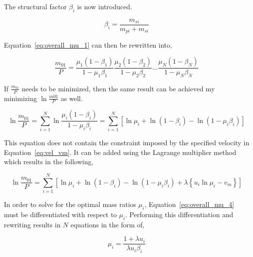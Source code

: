 The structural factor $\beta_i$ is now introduced.

\begin{equation}
    \beta_i = \frac{m_{si}}{m_{pi}+m_{si}}
\end{equation}

Equation~\eqref{eq:overall_mu_1} can then be rewritten into,

\begin{equation}
    \label{eq:overall_mu_2}
    \frac{m_{01}}{P} = \frac{\mu_1\left(1-\beta_1\right)}{1-\mu_1\beta_1}
                       \frac{\mu_2\left(1-\beta_2\right)}{1-\mu_2\beta_2} \dots
                       \frac{\mu_N\left(1-\beta_N\right)}{1-\mu_N\beta_N}
\end{equation}

If $\frac{m_{01}}{P}$ needs to be minimized, then the same result can be achieved my minimizing $\ln{\frac{m01}{P}}$ as well.

\begin{equation}
    \label{eq:overall_mu_3}
    \ln{\frac{m_{01}}{P}} = \sum_{i=1}^N \ln{\frac{\mu_i\left(1-\beta_i\right)}{1-\mu_i\beta_i}} 
                          = \sum_{i=1}^N \left[\ln{\mu_i} 
                                         + \ln{\left(1-\beta_i\right)} 
                                         - \ln{\left(1-\mu_i\beta_i\right)} \right]
\end{equation}

This equation does not contain the constraint imposed by the specified velocity in Equation~\ref{eq:vel_vm}. It can be added using the Lagrange multiplier method which results in the following,

\begin{equation}
    \label{eq:overall_mu_4}
    \ln{\frac{m_{01}}{P}} = \sum_{i=1}^N \left[\ln{\mu_i} 
                                      + \ln{\left(1-\beta_i\right)} 
                                      - \ln{\left(1-\mu_i\beta_i\right)} 
                                      + \lambda \left\{u_i\ln{\mu_i - v_m}\right\}  \right]
\end{equation}

In order to solve for the optimal mass ratios $\mu_i$, Equation~\eqref{eq:overall_mu_4} must be differentiated with respect to $\mu_i$. Performing this differentiation and rewriting results in $N$ equations in the form of,

\begin{equation}    
    \label{eq:mu_lambda}
    \mu_i=\frac{1+\lambda u_i}{\lambda u_i \beta_i}
\end{equation}

